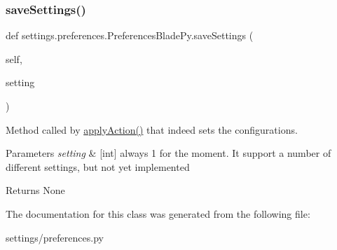\subsubsection{\texorpdfstring{save\+Settings()}{saveSettings()}}
{\footnotesize\ttfamily def settings.\+preferences.\+Preferences\+Blade\+Py.\+save\+Settings (\begin{DoxyParamCaption}\item[{}]{self,  }\item[{}]{setting }\end{DoxyParamCaption})}



Method called by \hyperlink{a00103_a8938a7b43ca7c5496a0ae7bf8d6a0c54}{apply\+Action()} that indeed sets the configurations. 


\begin{DoxyParams}{Parameters}
{\em setting} & \mbox{[}int\mbox{]} always 1 for the moment. It support a number of different settings, but not yet implemented \\
\hline
\end{DoxyParams}
\begin{DoxyReturn}{Returns}
None 
\end{DoxyReturn}


The documentation for this class was generated from the following file\+:\begin{DoxyCompactItemize}
\item 
settings/preferences.\+py\end{DoxyCompactItemize}
